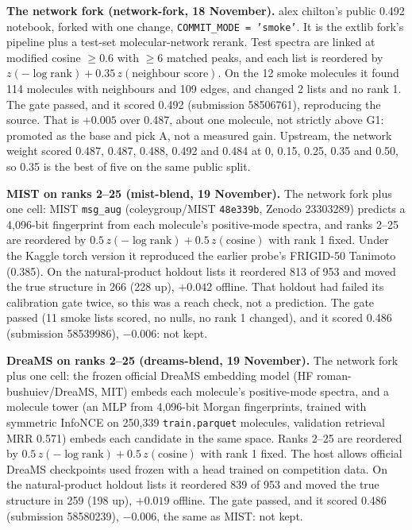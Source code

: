 \documentclass[11pt]{article}
\begin{document}
\textbf{The network fork (network-fork, 18 November).} alex chilton's public 0.492 notebook, forked with one change,
\texttt{COMMIT\_MODE = 'smoke'}. It is the extlib fork's pipeline plus a test-set molecular-network rerank. Test spectra
are linked at modified cosine $\ge 0.6$ with $\ge 6$ matched peaks, and each list is reordered by
$z(-\log\text{rank}) + 0.35\,z(\text{neighbour score})$. On the 12 smoke molecules it found 114 molecules with neighbours
and 109 edges, and changed 2 lists and no rank 1. The gate passed, and it scored 0.492 (submission 58506761),
reproducing the source. That is $+0.005$ over 0.487, about one molecule, not strictly above G1: promoted as the base and
pick A, not a measured gain. Upstream, the network weight scored 0.487, 0.487, 0.488, 0.492 and 0.484 at 0, 0.15, 0.25,
0.35 and 0.50, so 0.35 is the best of five on the same public split.

\textbf{MIST on ranks 2--25 (mist-blend, 19 November).} The network fork plus one cell: MIST \texttt{msg\_aug}
(coleygroup/MIST \texttt{48e339b}, Zenodo 23303289) predicts a 4,096-bit fingerprint from each molecule's positive-mode
spectra, and ranks 2--25 are reordered by $0.5\,z(-\log\text{rank}) + 0.5\,z(\text{cosine})$ with rank 1 fixed. Under
the Kaggle torch version it reproduced the earlier probe's FRIGID-50 Tanimoto (0.385). On the natural-product holdout
lists it reordered 813 of 953 and moved the true structure in 266 (228 up), $+0.042$ offline. That holdout had failed
its calibration gate twice, so this was a reach check, not a prediction. The gate passed (11 smoke lists scored,
no nulls, no rank 1 changed), and it scored 0.486 (submission 58539986), $-0.006$: not kept.

\textbf{DreaMS on ranks 2--25 (dreams-blend, 19 November).} The network fork plus one cell: the frozen official DreaMS
embedding model (HF roman-bushuiev/DreaMS, MIT) embeds each molecule's positive-mode spectra, and a molecule tower (an MLP
from 4,096-bit Morgan fingerprints, trained with symmetric InfoNCE on 250{,}339 \texttt{train.parquet} molecules, validation
retrieval MRR 0.571) embeds each candidate in the same space. Ranks 2--25 are reordered by
$0.5\,z(-\log\text{rank}) + 0.5\,z(\text{cosine})$ with rank 1 fixed. The host allows official DreaMS checkpoints used frozen
with a head trained on competition data. On the natural-product holdout lists it reordered 839 of 953 and moved the true
structure in 259 (198 up), $+0.019$ offline. The gate passed, and it scored 0.486 (submission 58580239), $-0.006$, the same
as MIST: not kept.
\end{document}
